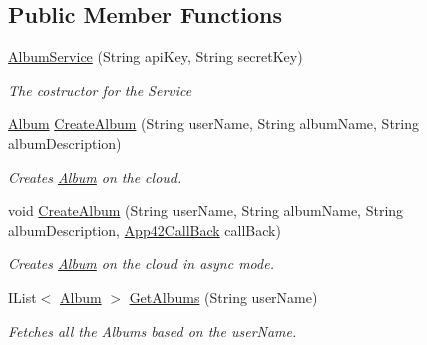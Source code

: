 \subsection*{Public Member Functions}
\begin{DoxyCompactItemize}
\item 
\hyperlink{classcom_1_1shephertz_1_1app42_1_1paas_1_1sdk_1_1csharp_1_1gallery_1_1_album_service_a8d8056ebf8d3e66bce744ab11e4c67e7}{Album\+Service} (String api\+Key, String secret\+Key)
\begin{DoxyCompactList}\small\item\em The costructor for the Service \end{DoxyCompactList}\item 
\hyperlink{classcom_1_1shephertz_1_1app42_1_1paas_1_1sdk_1_1csharp_1_1gallery_1_1_album}{Album} \hyperlink{classcom_1_1shephertz_1_1app42_1_1paas_1_1sdk_1_1csharp_1_1gallery_1_1_album_service_ac8c4fe1f101571e66d566113a0e2d93c}{Create\+Album} (String user\+Name, String album\+Name, String album\+Description)
\begin{DoxyCompactList}\small\item\em Creates \hyperlink{classcom_1_1shephertz_1_1app42_1_1paas_1_1sdk_1_1csharp_1_1gallery_1_1_album}{Album} on the cloud. \end{DoxyCompactList}\item 
void \hyperlink{classcom_1_1shephertz_1_1app42_1_1paas_1_1sdk_1_1csharp_1_1gallery_1_1_album_service_a585d12bf245dfe6fe1494d5652fd8281}{Create\+Album} (String user\+Name, String album\+Name, String album\+Description, \hyperlink{interfacecom_1_1shephertz_1_1app42_1_1paas_1_1sdk_1_1csharp_1_1_app42_call_back}{App42\+Call\+Back} call\+Back)
\begin{DoxyCompactList}\small\item\em Creates \hyperlink{classcom_1_1shephertz_1_1app42_1_1paas_1_1sdk_1_1csharp_1_1gallery_1_1_album}{Album} on the cloud in async mode. \end{DoxyCompactList}\item 
I\+List$<$ \hyperlink{classcom_1_1shephertz_1_1app42_1_1paas_1_1sdk_1_1csharp_1_1gallery_1_1_album}{Album} $>$ \hyperlink{classcom_1_1shephertz_1_1app42_1_1paas_1_1sdk_1_1csharp_1_1gallery_1_1_album_service_a0ea8e6243142c0280a8d8ea8fd4852df}{Get\+Albums} (String user\+Name)
\begin{DoxyCompactList}\small\item\em Fetches all the Albums based on the user\+Name. \end{DoxyCompactList}\item 

\end{DoxyCompactItemize}
